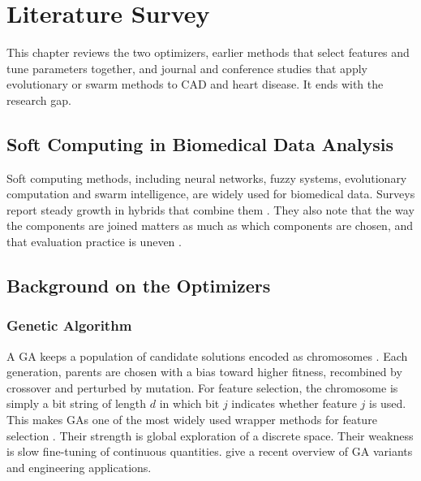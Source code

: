 \documentclass[MTech]{ugthesis}
\begin{document}
\chapter{Literature Survey}
\label{chap:lit}

This chapter reviews the two optimizers, earlier methods that select features and tune parameters together, and journal and conference studies that apply evolutionary or swarm methods to CAD and heart disease. It ends with the research gap.

\section{Soft Computing in Biomedical Data Analysis}
Soft computing methods, including neural networks, fuzzy systems, evolutionary computation and swarm intelligence, are widely used for biomedical data. Surveys report steady growth in hybrids that combine them \citep{yardimci2009medicine,houssein2023softcomputing}. They also note that the way the components are joined matters as much as which components are chosen, and that evaluation practice is uneven \citep{xie2014emg}.

\section{Background on the Optimizers}
\subsection{Genetic Algorithm}
A GA keeps a population of candidate solutions encoded as chromosomes \citep{holland1975,goldberg1989}. Each generation, parents are chosen with a bias toward higher fitness, recombined by crossover and perturbed by mutation. For feature selection, the chromosome is simply a bit string of length $d$ in which bit $j$ indicates whether feature $j$ is used. This makes GAs one of the most widely used wrapper methods for feature selection \citep{xue2016fssurvey}. Their strength is global exploration of a discrete space. Their weakness is slow fine-tuning of continuous quantities. \citet{slowik2020ea} give a recent overview of GA variants and engineering applications.
\end{document}
